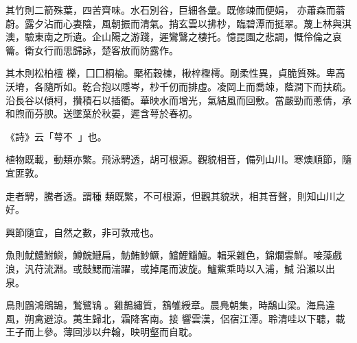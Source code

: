 \begin{pinyinscope}
其竹則二箭殊葉，四苦齊味。水石別谷，巨細各彙。既修竦而便娟，
 亦蕭森而蓊蔚。露夕沾而心妻陰，風朝振而清氣。捎玄雲以拂杪，臨碧潭而挺翠。蔑上林與淇澳，驗東南之所遺。企山陽之游踐，遲鸞鷖之棲托。憶昆園之悲調，慨伶倫之哀籥。衛女行而思歸詠，楚客放而防露作。


其木則松柏檀
 櫟，囗囗桐榆。檿柘穀棟，楸梓檉樗。剛柔性異，貞脆質殊。卑高沃塉，各隨所如。乾合抱以隱岑，杪千仞而排虛。凌岡上而喬竦，蔭澗下而扶疏。沿長谷以傾柯，攢積石以插衢。華映水而增光，氣結風而回敷。當嚴勁而蔥倩，承和煦而芬腴。送墜葉於秋晏，遲含萼於春初。



 《詩》云「萼不𩋾𩋾」也。


植物既載，動類亦繁。飛泳騁透，胡可根源。觀貌相音，備列山川。寒燠順節，隨宜匪敦。



 走者騁，騰者透。謂種
 類既繁，不可根源，但觀其貌狀，相其音聲，則知山川之好。



 興節隨宜，自然之數，非可敦戒也。


魚則魷鱧鮒鱮，鱒鯇鰱扁，魴鮪魦鱖，鱨鯉鯔鱣。輯采雜色，錦爛雲鮮。唼藻戲浪，汎苻流淵。或鼓鰓而湍躍，或掉尾而波旋。鱸鮆乘時以入浦，鰔𩷰沿瀨以出泉。


鳥則鵾鴻鶂鵠，鶖鷺鴇𪃥。雞鵲繡質，鶷雊綬章。晨鳧朝集，時鷮山梁。海鳥違風，朔禽避涼。荑生歸北，霜降客南。接
 響雲漢，侶宿江潭。聆清哇以下聽，載王子而上參。薄回涉以弁翰，映明壑而自耽。




\end{pinyinscope}
